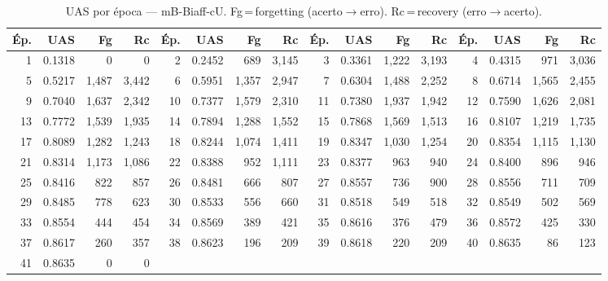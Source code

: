 \begin{table}[ht]
\centering\scriptsize
\caption{UAS por época --- mB-Biaff-cU. Fg\,=\,forgetting (acerto$\to$erro). Rc\,=\,recovery (erro$\to$acerto).}
\label{tab:uas-predictions-results-mbert-biaffine}
\begin{tabular}{rrrr rrrr rrrr rrrr}
\toprule
\textbf{Ép.} & \textbf{UAS} & \textbf{Fg} & \textbf{Rc} & \textbf{Ép.} & \textbf{UAS} & \textbf{Fg} & \textbf{Rc} & \textbf{Ép.} & \textbf{UAS} & \textbf{Fg} & \textbf{Rc} & \textbf{Ép.} & \textbf{UAS} & \textbf{Fg} & \textbf{Rc} \\
\midrule
1 & 0.1318 & 0 & 0 & 2 & 0.2452 & 689 & 3,145 & 3 & 0.3361 & 1,222 & 3,193 & 4 & 0.4315 & 971 & 3,036 \\
5 & 0.5217 & 1,487 & 3,442 & 6 & 0.5951 & 1,357 & 2,947 & 7 & 0.6304 & 1,488 & 2,252 & 8 & 0.6714 & 1,565 & 2,455 \\
9 & 0.7040 & 1,637 & 2,342 & 10 & 0.7377 & 1,579 & 2,310 & 11 & 0.7380 & 1,937 & 1,942 & 12 & 0.7590 & 1,626 & 2,081 \\
13 & 0.7772 & 1,539 & 1,935 & 14 & 0.7894 & 1,288 & 1,552 & 15 & 0.7868 & 1,569 & 1,513 & 16 & 0.8107 & 1,219 & 1,735 \\
17 & 0.8089 & 1,282 & 1,243 & 18 & 0.8244 & 1,074 & 1,411 & 19 & 0.8347 & 1,030 & 1,254 & 20 & 0.8354 & 1,115 & 1,130 \\
21 & 0.8314 & 1,173 & 1,086 & 22 & 0.8388 & 952 & 1,111 & 23 & 0.8377 & 963 & 940 & 24 & 0.8400 & 896 & 946 \\
25 & 0.8416 & 822 & 857 & 26 & 0.8481 & 666 & 807 & 27 & 0.8557 & 736 & 900 & 28 & 0.8556 & 711 & 709 \\
29 & 0.8485 & 778 & 623 & 30 & 0.8533 & 556 & 660 & 31 & 0.8518 & 549 & 518 & 32 & 0.8549 & 502 & 569 \\
33 & 0.8554 & 444 & 454 & 34 & 0.8569 & 389 & 421 & 35 & 0.8616 & 376 & 479 & 36 & 0.8572 & 425 & 330 \\
37 & 0.8617 & 260 & 357 & 38 & 0.8623 & 196 & 209 & 39 & 0.8618 & 220 & 209 & 40 & 0.8635 & 86 & 123 \\
41 & 0.8635 & 0 & 0 &  & & &  &  & & &  &  & & &  \\
\bottomrule
\end{tabular}
\end{table}
